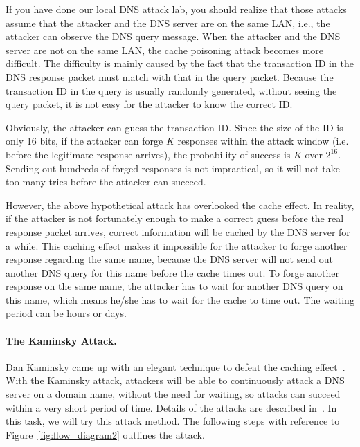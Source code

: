 If you have done our local DNS attack lab, you should realize that 
those attacks assume that the attacker and the DNS server are on
the same LAN, i.e., the attacker can observe the DNS query message. 
When the attacker and the DNS server are not on the same LAN,
the cache poisoning attack becomes more difficult.
The difficulty is mainly caused by the fact that the transaction ID
in the DNS response packet must match with that 
in the query packet. Because the transaction ID in the query is 
usually randomly generated, without seeing the query packet,
it is not easy for the attacker to know the correct ID.


Obviously, the attacker can guess the transaction ID. Since the
size of the ID is only 16 bits, if the attacker can forge $K$ 
responses within the attack window (i.e. before the legitimate
response arrives), the probability of success is $K$ over $2^{16}$.
Sending out hundreds of forged responses is not impractical, so
it will not take too many tries before the attacker can succeed. 


However, the above hypothetical attack has overlooked the cache effect.
In reality, if the attacker is not fortunately enough to make a correct guess before
the real response packet arrives, correct information will be cached 
by the DNS server for a while. This caching effect makes it impossible
for the attacker to forge another response regarding the same 
name, because the DNS server will not send out another DNS query for 
this name before the cache times out.
To forge another response on the same name, the attacker has to 
wait for another DNS query on this name, which means he/she has to
wait for the cache to time out. The waiting period can be hours or days.


\paragraph{The Kaminsky Attack.} 
Dan Kaminsky came up with an elegant technique to defeat the caching
effect~\cite{dns:Kaminsky}.
With the Kaminsky attack, attackers will be able to continuously attack
a DNS server on a domain name, without the need for waiting, so
attacks can succeed within a very short period of time.
Details of the attacks are described in~\cite{dns:Kaminsky,seedbook}. 
In this task, we will try this attack method. The following steps with reference to 
Figure~\ref{fig:flow_diagram2} outlines the attack. 

